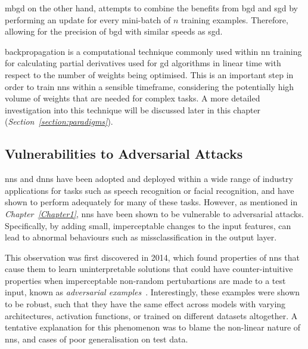 \gls{mbgd} on the other hand, attempts to combine the benefits from \gls{bgd} and \gls{sgd} by 
performing an update for every mini-batch of $n$ training examples. Therefore, allowing for the precision of
\gls{bgd} with similar speeds as \gls{sgd}.

backpropagation is a computational technique commonly used within \gls{nn} training for calculating
partial derivatives used for \gls{gd} algorithms in linear time with respect 
to the number of weights being optimised. This is an important
step in order to train \glspl{nn} within a sensible timeframe, considering the potentially
high volume of weights that are needed for complex tasks. A more detailed 
investigation into this technique will be discussed later in this chapter (\textit{Section~\ref{section:paradigms}}).

\subsection{Vulnerabilities to Adversarial Attacks}

\glspl{nn} and \glspl{dnn} have been adopted and deployed within a wide
range of industry applications for tasks such as speech recognition or facial recognition, 
and have shown to perform adequately for many of these tasks. However, as mentioned in \textit{Chapter~\ref{Chapter1}}, \glspl{nn} have been shown to be
vulnerable to adversarial attacks. Specifically, by adding small, imperceptable changes
to the input features, can lead to abnormal behaviours such as missclassification in the output layer.

This observation was first discovered in 2014,
which found properties of \glspl{nn} that cause them to learn uninterpretable solutions that could have counter-intuitive properties when
imperceptable non-random pertubartions are made to a test input, known as \textit{adversarial examples}~\citep{szegedy2014}. 
Interestingly, these examples were shown to be robust, such that they have the same effect
across models with varying architectures, activation functions, or trained on different datasets altogether. A tentative
explanation for this phenomenon was to blame the non-linear nature of \glspl{nn}, and cases of poor generalisation on test data.

